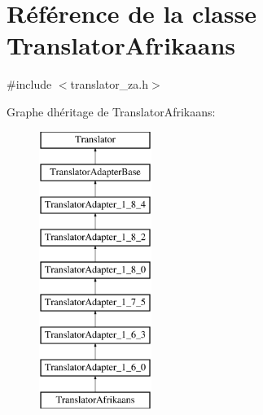 \hypertarget{class_translator_afrikaans}{}\section{Référence de la classe Translator\+Afrikaans}
\label{class_translator_afrikaans}


{\ttfamily \#include $<$translator\+\_\+za.\+h$>$}

Graphe d\textquotesingle{}héritage de Translator\+Afrikaans\+:\begin{figure}[H]
\begin{center}
\leavevmode
\includegraphics[height=9.000000cm]{class_translator_afrikaans}
\end{center}
\end{figure}
